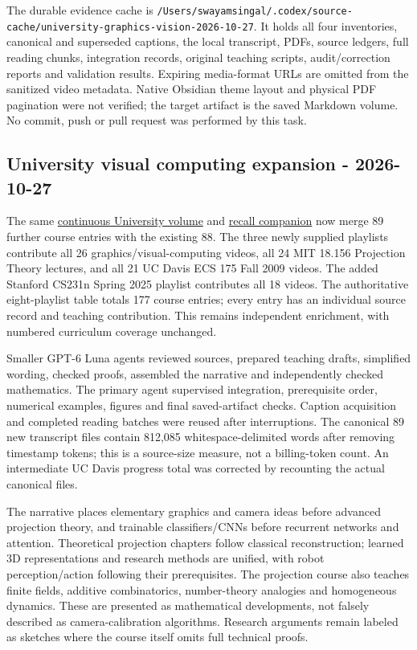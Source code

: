 The durable evidence cache is \texttt{/Users/swayamsingal/.codex/source-cache/university-graphics-vision-2026-10-27}. It holds all four inventories, canonical and superseded captions, the local transcript, PDFs, source ledgers, full reading chunks, integration records, original teaching scripts, audit/correction reports and validation results. Expiring media-format URLs are omitted from the sanitized video metadata. Native Obsidian theme layout and physical PDF pagination were not verified; the target artifact is the saved Markdown volume. No commit, push or pull request was performed by this task.

\subsection{University visual computing expansion - 2026-10-27}\label{appendix-a103e7846d21-university-visual-computing-expansion---2026-10-27}

The same \href{Continuous\%20Notes/University\%20-\%20Worlds,\%20Images\%20and\%20Inference\%20-\%20Graphics,\%20Vision\%20and\%20Photography}{continuous University volume} and \hyperref[appendix-a8f634b076b5]{recall companion} now merge 89 further course entries with the existing 88. The three newly supplied playlists contribute all 26 graphics/visual-computing videos, all 24 MIT 18.156 Projection Theory lectures, and all 21 UC Davis ECS 175 Fall 2009 videos. The added Stanford CS231n Spring 2025 playlist contributes all 18 videos. The authoritative eight-playlist table totals 177 course entries; every entry has an individual source record and teaching contribution. This remains independent enrichment, with numbered curriculum coverage unchanged.

Smaller GPT-6 Luna agents reviewed sources, prepared teaching drafts, simplified wording, checked proofs, assembled the narrative and independently checked mathematics. The primary agent supervised integration, prerequisite order, numerical examples, figures and final saved-artifact checks. Caption acquisition and completed reading batches were reused after interruptions. The canonical 89 new transcript files contain 812,085 whitespace-delimited words after removing timestamp tokens; this is a source-size measure, not a billing-token count. An intermediate UC Davis progress total was corrected by recounting the actual canonical files.

The narrative places elementary graphics and camera ideas before advanced projection theory, and trainable classifiers/CNNs before recurrent networks and attention. Theoretical projection chapters follow classical reconstruction; learned 3D representations and research methods are unified, with robot perception/action following their prerequisites. The projection course also teaches finite fields, additive combinatorics, number-theory analogies and homogeneous dynamics. These are presented as mathematical developments, not falsely described as camera-calibration algorithms. Research arguments remain labeled as sketches where the course itself omits full technical proofs.

